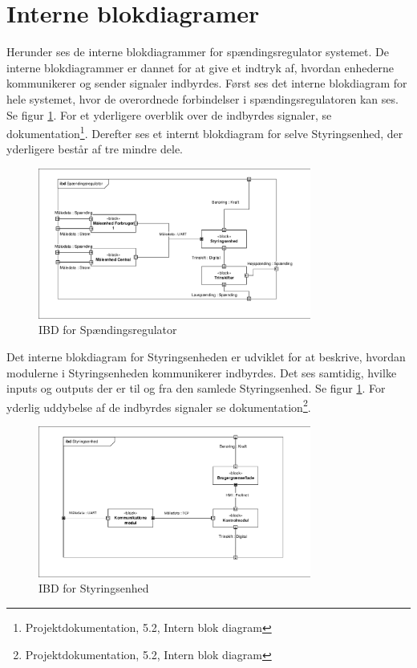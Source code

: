 

\section{Interne blokdiagramer}

Herunder ses de interne blokdiagrammer for spændingsregulator systemet. De interne blokdiagrammer er dannet for at give et indtryk af, hvordan enhederne kommunikerer og sender signaler indbyrdes. Først ses det interne blokdiagram for hele systemet, hvor de overordnede forbindelser i spændingsregulatoren kan ses. Se figur \ref{fig:IBDSp}. For et yderligere overblik over de indbyrdes signaler, se dokumentation\footnote{Projektdokumentation, 5.2, Intern blok diagram}.  Derefter ses et internt blokdiagram for selve Styringsenhed, der yderligere består af tre mindre dele. 

\begin{figure}[htbp] %
	\centering
	\includegraphics[width=0.8\textwidth]{figure/IBDSpaendingsregulator.pdf}
	\caption{IBD for Spændingsregulator}
	\label{fig:IBDSp}
\end{figure}

Det interne blokdiagram for Styringsenheden er udviklet for at beskrive, hvordan modulerne i Styringsenheden kommunikerer indbyrdes. Det ses samtidig, hvilke inputs og outputs der er til og fra den samlede Styringsenhed. Se figur \ref{fig:IBDSp}. For yderlig uddybelse af de indbyrdes signaler se dokumentation\footnote{Projektdokumentation, 5.2, Intern blok diagram}.


\begin{figure}[htbp] %
	\centering
	\includegraphics[width=0.8\textwidth]{figure/IBDStyringsenhed.pdf}
	\caption{IBD for Styringsenhed}
	\label{fig:IBDSt}
\end{figure}




